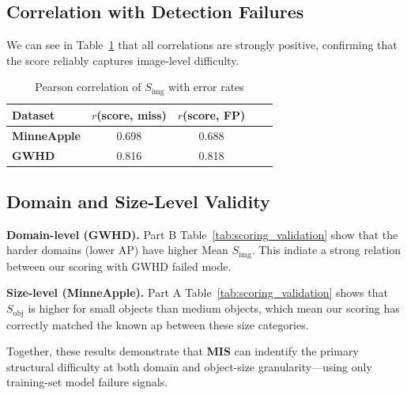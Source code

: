 \documentclass[conference]{IEEEtran}
\begin{document}
\subsection{Correlation with Detection Failures}

We can see in Table~\ref{tab:corr} that
all correlations are strongly positive, confirming
that the score reliably captures image-level difficulty.

\begin{table}[ht]
\centering
\caption{Pearson correlation of $S_{\mathrm{img}}$ with error rates}
\label{tab:corr}
\small
\setlength{\tabcolsep}{5pt}
\begin{tabular}{@{}lcccc@{}}
\toprule
\textbf{Dataset} & $r$(score, miss) & $r$(score, FP) \\ \midrule
\textbf{MinneApple} & 0.698 & 0.688 \\
\textbf{GWHD} & 0.816 & 0.818 \\ \bottomrule
\end{tabular}
\end{table}

\subsection{Domain and Size-Level Validity}


\noindent\textbf{Domain-level (GWHD).}
Part B Table~\ref{tab:scoring_validation} show that the harder domains (lower AP) 
have higher Mean $S_{\mathrm{img}}$.
This indiate a strong relation between our scoring with GWHD failed mode.


\noindent\textbf{Size-level (MinneApple).}
Part A Table~\ref{tab:scoring_validation} shows that $S_{\mathrm{obj}}$ is
 higher for small objects than medium objects, which mean
our scoring has correctly
matched the known ap between these size categories.

Together, these results demonstrate that \textbf{MIS} can 
indentify the primary structural difficulty at both
domain and object-size granularity---using only training-set
model failure signals.
\end{document}
